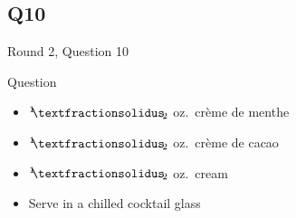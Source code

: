 \documentclass[11pt]{beamer}
\begin{document}
\subsection*{Q10}
\begin{frame}[t]{Round 2, Question 10}
\begin{block}{Question}
\begin{itemize}
\item \({}^1{\mskip -5mu⁄\mskip -3mu}_2\) oz.\ crème de menthe
\item \({}^1{\mskip -5mu⁄\mskip -3mu}_2\) oz.\ crème de cacao
\item \({}^1{\mskip -5mu⁄\mskip -3mu}_2\) oz.\ cream
\item Serve in a chilled cocktail glass
\end{itemize}
\end{block}
\end{frame}
\end{document}
